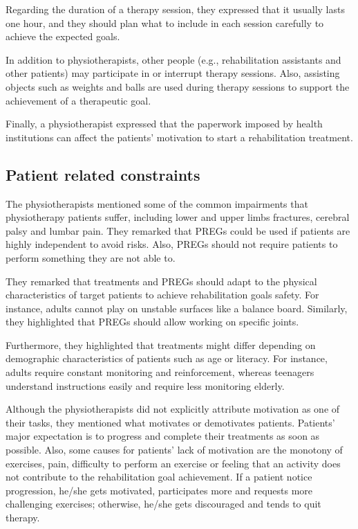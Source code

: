 Regarding the duration of a therapy session, they expressed that it usually lasts one hour, and they should plan what to include in each session carefully to achieve the expected goals.

In addition to physiotherapists, other people (e.g., rehabilitation assistants and other patients) may participate in or interrupt therapy sessions. Also, assisting objects such as weights and balls are used during therapy sessions to support the achievement of a therapeutic goal.

Finally, a physiotherapist expressed that the paperwork imposed by health institutions can affect the patients' motivation to start a rehabilitation treatment.

\subsection{Patient related constraints}
\label{sec:reh_patients_constraints}
The physiotherapists mentioned some of the common impairments that physiotherapy patients suffer, including lower and upper limbs fractures, cerebral palsy and lumbar pain. They remarked that \acp{PREG} could be used if patients are highly independent to avoid risks. Also, \acp{PREG} should not require patients to perform something they are not able to.

They remarked that treatments and \acp{PREG} should adapt to the physical characteristics of target patients to achieve rehabilitation goals safety. For instance, adults cannot play on unstable surfaces like a balance board. Similarly, they highlighted that \acp{PREG} should allow working on specific joints.

Furthermore, they highlighted that treatments might differ depending on demographic characteristics of patients such as age or literacy. For instance, adults require constant monitoring and reinforcement, whereas teenagers understand instructions easily and require less monitoring elderly.

Although the physiotherapists did not explicitly attribute motivation as one of their tasks, they mentioned what motivates or demotivates patients. Patients' major expectation is to progress and complete their treatments as soon as possible. Also, some causes for patients' lack of motivation are the monotony of exercises, pain, difficulty to perform an exercise or feeling that an activity does not contribute to the rehabilitation goal achievement. If a patient notice progression, he/she gets motivated, participates more and requests more challenging exercises; otherwise, he/she gets discouraged and tends to quit therapy.

